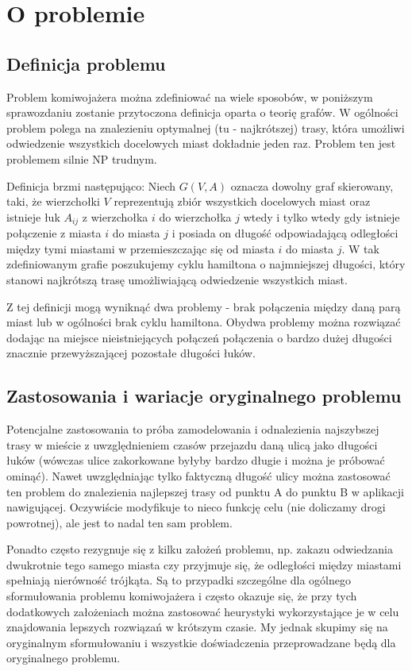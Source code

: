 \section{O problemie}
\subsection{Definicja problemu}
Problem komiwojażera można zdefiniować na wiele sposobów, w poniższym sprawozdaniu zostanie przytoczona definicja oparta o teorię grafów. W ogólności problem polega na znalezieniu optymalnej (tu - najkrótszej) trasy, która umożliwi odwiedzenie wszystkich docelowych miast dokładnie jeden raz. Problem ten jest problemem silnie NP trudnym.

Definicja brzmi następująco: Niech $G(V,A)$ oznacza dowolny graf skierowany, taki, że wierzchołki $V$ reprezentują zbiór wszystkich docelowych miast oraz istnieje łuk $A_{ij}$ z wierzchołka $i$ do wierzchołka $j$ wtedy i tylko wtedy gdy istnieje połączenie z miasta $i$ do miasta $j$ i posiada on długość odpowiadającą odległości między tymi miastami w przemieszczając się od miasta $i$ do miasta $j$. W tak zdefiniowanym grafie poszukujemy cyklu hamiltona o najmniejszej długości, który stanowi najkrótszą trasę umożliwiającą odwiedzenie wszystkich miast.

Z tej definicji mogą wyniknąć dwa problemy - brak połączenia między daną parą miast lub w ogólności brak cyklu hamiltona. Obydwa problemy można rozwiązać dodając na miejsce nieistniejących połączeń połączenia o bardzo dużej długości znacznie przewyższającej pozostałe długości łuków.

\subsection{Zastosowania i wariacje oryginalnego problemu}
Potencjalne zastosowania to próba zamodelowania i odnalezienia najszybszej trasy w mieście z uwzględnieniem czasów przejazdu daną ulicą jako długości łuków (wówczas ulice zakorkowane byłyby bardzo długie i można je próbować ominąć). Nawet uwzględniając tylko faktyczną długość ulicy można zastosować ten problem do znalezienia najlepszej trasy od punktu A do punktu B w aplikacji nawigującej. Oczywiście modyfikuje to nieco funkcję celu (nie doliczamy drogi powrotnej), ale jest to nadal ten sam problem.

Ponadto często rezygnuje się z kilku założeń problemu, np. zakazu odwiedzania dwukrotnie tego samego miasta czy przyjmuje się, że odległości między miastami spełniają nierówność trójkąta. Są to przypadki szczególne dla ogólnego sformułowania problemu komiwojażera i często okazuje się, że przy tych dodatkowych założeniach można zastosować heurystyki wykorzystające je w celu znajdowania lepszych rozwiązań w krótszym czasie. My jednak skupimy się na oryginalnym sformułowaniu i wszystkie doświadczenia przeprowadzane będą dla oryginalnego problemu.